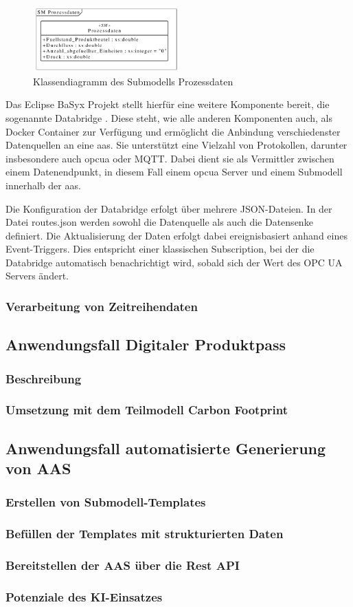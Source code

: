\begin{figure}[htbp]
    \centering
    \includegraphics[width=0.5\textwidth]{Bilder/UML/submodel_processdata.pdf}
    \caption{Klassendiagramm des Submodells Prozessdaten}
    \label{fig:UMLSubmodellProcessData}
\end{figure}

Das Eclipse BaSyx Projekt stellt hierfür eine weitere Komponente bereit, die sogenannte Databridge \cite{BaSyxDatabridge}.
Diese steht, wie alle anderen Komponenten auch, als Docker Container zur Verfügung und ermöglicht die Anbindung verschiedenster Datenquellen an eine \acs{aas}.
Sie unterstützt eine Vielzahl von Protokollen, darunter insbesondere auch \acs{opcua} oder MQTT.
Dabei dient sie als Vermittler zwischen einem Datenendpunkt, in diesem Fall einem \acs{opcua} Server und einem Submodell innerhalb der \acs{aas}.

Die Konfiguration der Databridge erfolgt über mehrere JSON-Dateien.
In der Datei routes.json werden sowohl die Datenquelle als auch die Datensenke definiert.
Die Aktualisierung der Daten erfolgt dabei ereignisbasiert anhand eines Event-Triggers.
Dies entspricht einer klassischen Subscription, bei der die Databridge automatisch benachrichtigt wird, sobald sich der Wert des OPC UA Servers ändert.




\subsubsection{Verarbeitung von Zeitreihendaten}

\subsection{Anwendungsfall Digitaler Produktpass}
\subsubsection{Beschreibung}
\subsubsection{Umsetzung mit dem Teilmodell Carbon Footprint}
\subsection{Anwendungsfall automatisierte Generierung von AAS}
\subsubsection{Erstellen von Submodell-Templates}
\subsubsection{Befüllen der Templates mit strukturierten Daten}
\subsubsection{Bereitstellen der AAS über die Rest API}
\subsubsection{Potenziale des KI-Einsatzes}